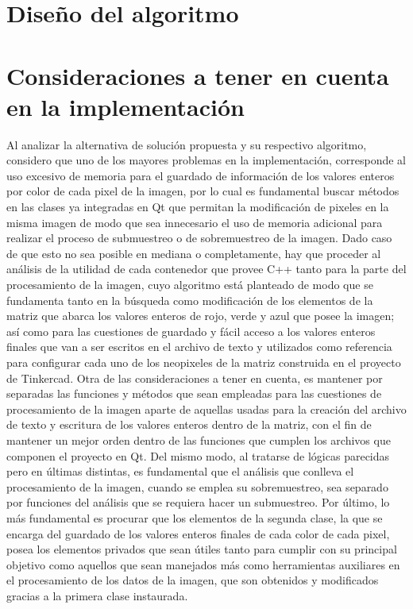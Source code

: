 \documentclass{article}
\begin{document}
 \section{Diseño del algoritmo}
 \section{Consideraciones a tener en cuenta en la implementación}
 Al analizar la alternativa de solución propuesta y su respectivo algoritmo, considero que uno de los mayores problemas en la implementación, corresponde al uso excesivo de memoria para el guardado de información de los valores enteros por color de cada pixel de la imagen, por lo cual es fundamental buscar métodos en las clases ya integradas en Qt que permitan la modificación de pixeles en la misma imagen de modo que sea innecesario el uso de memoria adicional para realizar el proceso de submuestreo o de sobremuestreo de la imagen. Dado caso de que esto no sea posible en mediana o completamente, hay que proceder al análisis de la utilidad de cada contenedor que provee C++ tanto para la parte del procesamiento de la imagen, cuyo algoritmo está planteado de modo que se fundamenta tanto en la búsqueda como modificación de los elementos de la matriz que abarca los valores enteros de rojo, verde y azul que posee la imagen; así como para las cuestiones de guardado y fácil acceso a los valores enteros finales que van a ser escritos en el archivo de texto y utilizados como referencia para configurar cada uno de los neopixeles de la matriz construida en el proyecto de Tinkercad. Otra de las consideraciones a tener en cuenta, es mantener por separadas las funciones y métodos que sean empleadas para las cuestiones de procesamiento de la imagen aparte de aquellas usadas para la creación del archivo de texto y escritura de los valores enteros dentro de la matriz, con el fin de mantener un mejor orden dentro de las funciones que cumplen los archivos que componen el proyecto en Qt. Del mismo modo, al tratarse de lógicas parecidas pero en últimas distintas, es fundamental que el análisis que conlleva el procesamiento de la imagen, cuando se emplea su sobremuestreo, sea separado por funciones del análisis que se requiera hacer un submuestreo. Por último, lo más fundamental es procurar que los elementos de la segunda clase, la que se encarga del guardado de los valores enteros finales de cada color de cada pixel, posea los elementos privados que sean útiles tanto para cumplir con su principal objetivo como aquellos que sean manejados más como herramientas auxiliares en el procesamiento de los datos de la imagen, que son obtenidos y modificados gracias a la primera clase instaurada.


\end{document}
